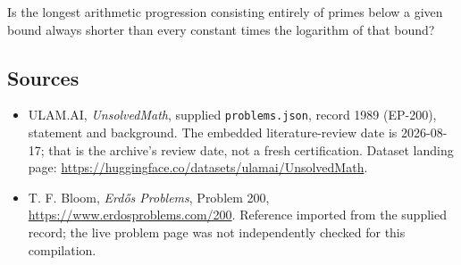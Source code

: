 \documentclass[11pt,a4paper]{article}
\begin{document}
Is the longest arithmetic progression consisting entirely of primes below a given bound always shorter than every constant times the logarithm of that bound?

\subsection{Sources}

{\small

\begin{itemize}

\item[\hypertarget{source:1989:1}{S1}] ULAM.AI, \emph{UnsolvedMath}, supplied \texttt{problems.json}, record 1989 (EP-200), statement and background. The embedded literature-review date is 2026-08-17; that is the archive’s review date, not a fresh certification. Dataset landing page: \url{https://huggingface.co/datasets/ulamai/UnsolvedMath}.

\item[\hypertarget{source:1989:2}{S2}] T. F. Bloom, \emph{Erdős Problems}, Problem 200, \url{https://www.erdosproblems.com/200}. Reference imported from the supplied record; the live problem page was not independently checked for this compilation.

\end{itemize}

}

\label{end:1989}
\end{document}
